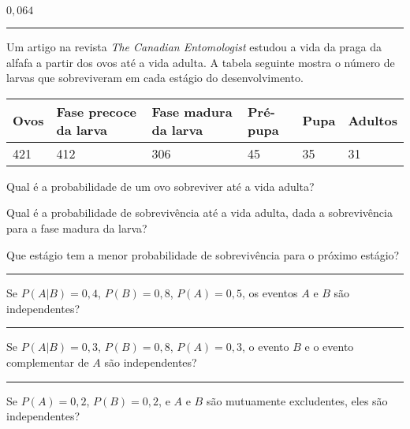 \documentclass[a4paper,11pt,fleqn]{article}\usepackage[]{graphicx}\usepackage[]{color}
\theoremstyle{definition}
\begin{document}
\begin{compactenum}
\item $0,064$

\vspace{0.3cm}
\hrule
\vspace{0.3cm}

\item Um artigo na revista \textit{The Canadian Entomologist} estudou a
  vida da praga da alfafa a partir dos ovos até a vida adulta. A tabela
  seguinte mostra o número de larvas que sobreviveram em cada estágio do
  desenvolvimento.
  \begin{table}[!h]
    \centering
    \begin{tabular}{lp{2cm}p{2cm}lll}
      Ovos & Fase precoce da larva & Fase madura da larva & Pré-pupa
      & Pupa & Adultos \\
      \hline
      421 & 412 & 306 & 45 & 35 & 31 \\
    \end{tabular}
  \end{table}
  \begin{compactenum}
  \item Qual é a probabilidade de um ovo sobreviver até a vida adulta?
  \item Qual é a probabilidade de sobrevivência até a vida adulta, dada
    a sobrevivência para a fase madura da larva?
  \item Que estágio tem a menor probabilidade de sobrevivência para o
    próximo estágio?
  \end{compactenum}

\vspace{0.3cm}
\hrule
\vspace{0.3cm}

\item Se $P(A|B) = 0,4$, $P(B) = 0,8$, $P(A) = 0,5$, os eventos $A$ e
  $B$ são independentes?

\vspace{0.3cm}
\hrule
\vspace{0.3cm}

\item Se $P(A|B) = 0,3$, $P(B) = 0,8$, $P(A) = 0,3$, o evento $B$ e o
  evento complementar de $A$ são independentes?

\vspace{0.3cm}
\hrule
\vspace{0.3cm}

\item Se $P(A) = 0,2$, $P(B) = 0,2$, e $A$ e $B$ são mutuamente
  excludentes, eles são independentes?


\end{compactenum}
\end{document}
